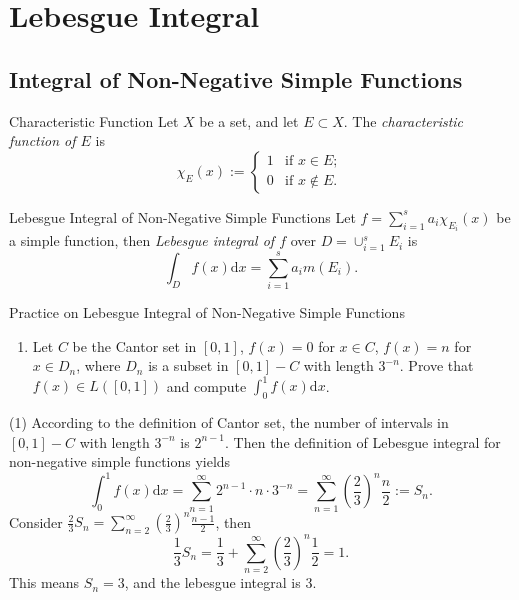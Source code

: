 

\section{Lebesgue Integral}

\subsection{Integral of Non-Negative Simple Functions}

\begin{definition}{Characteristic Function}{}
  Let $X$ be a set, and let $E \subset X$.
  The \emph{characteristic function of $E$} is
  \begin{equation}
    \chi_E(x) :=
    \begin{cases}
      1 & \text{if } x \in E;\\
      0 & \text{if } x \not \in E.
    \end{cases}
  \end{equation}
\end{definition}

\begin{definition}{Lebesgue Integral of Non-Negative Simple Functions}{}
  Let $f = \sum _{i = 1}^s a_i \chi_{E_i}(x)$ be a simple function,
  then \emph{Lebesgue integral of $f$} over $D = \cup _{i = 1}^s E_i$ is
  \begin{equation}
    \int_D f(x)\mathrm{d} x = \sum\limits_{i = 1}^s a_i m(E_i).
  \end{equation}
\end{definition}

\begin{example}{Practice on Lebesgue Integral of Non-Negative Simple Functions}{}
  \begin{enumerate}
  \item Let $C$ be the Cantor set in $[0, 1]$,
    $f(x) = 0$ for $x \in C$, $f(x) = n$ for $x \in D_n$,
    where $D_n$ is a subset in $[0, 1] - C$ with length $3^{-n}$.
    Prove that $f(x) \in L([0, 1])$ and compute $\int_0^1 f(x)\mathrm{d} x$.
  \end{enumerate}
\end{example}

\begin{solution}
  (1) According to the definition of Cantor set,
  the number of intervals in $[0, 1] - C$ with length $3^{-n}$ is $2^{n-1}$.
  Then the definition of Lebesgue integral for non-negative simple functions yields
  \begin{equation}
    \int_0^1 f(x)\mathrm{d} x
    = \sum\limits_{n = 1}^{\infty} 2^{n-1} \cdot n \cdot 3^{-n}
    = \sum\limits_{n = 1}^{\infty} \left( \frac{2}{3} \right)^n \frac{n}{2}
    := S_n.
  \end{equation}
  Consider $\frac{2}{3}S_n = \sum\limits_{n = 2}^{\infty} (\frac{2}{3})^n
  \frac{n-1}{2}$, then
  \begin{equation}
    \frac{1}{3}S_n = \frac{1}{3} + \sum\limits_{n = 2}^{\infty} \left( \frac{2}{3} \right)^n \frac{1}{2}
    = 1.
  \end{equation}
  This means $S_n = 3$, and the lebesgue integral is $3$.
\end{solution}

